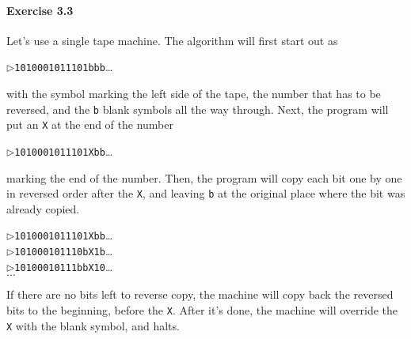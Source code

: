 \documentclass[a4paper,12pt]{article}
\newcommand{\exercise}[1]{\paragraph{Exercise #1}}
\begin{document}
    \exercise{3.3} Let's use a single tape machine. The algorithm will first start out as
    \begin{center}
        $\triangleright$\texttt{1010001011101bbb}\ldots
    \end{center}
    with the symbol marking the left side of the tape, the number that has to be reversed, and the \texttt{b} blank symbols all the way through. Next, the program will put an \texttt{X} at the end of the number
    \begin{center}
        $\triangleright$\texttt{1010001011101Xbb}\ldots
    \end{center}
    marking the end of the number. Then, the program will copy each bit one by one in reversed order after the \texttt{X}, and leaving \texttt{b} at the original place where the bit was already copied.
    \begin{center}
        $\triangleright$\texttt{1010001011101Xbb}\ldots\\
        $\triangleright$\texttt{101000101110bX1b}\ldots\\
        $\triangleright$\texttt{10100010111bbX10}\ldots\\
        $\ldots$
    \end{center}
    If there are no bits left to reverse copy, the machine will copy back the reversed bits to the beginning, before the \texttt{X}. After it's done, the machine will override the \texttt{X} with the blank symbol, and halts.
\end{document}

